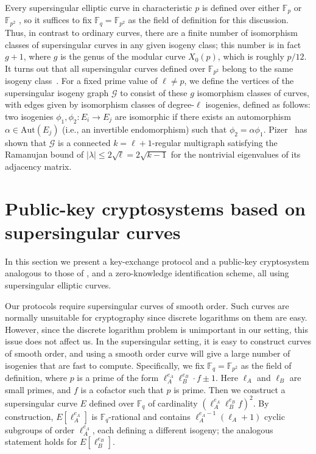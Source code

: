 \documentclass[jmc]{degruyter-journal-a}
\theoremstyle{definition}
\newcommand{\FF}{{\mathbb{F}}}
\begin{document}
Every supersingular elliptic curve in characteristic $p$ is defined
over either $\FF_p$ or $\FF_{p^2}$ \cite{Sil}, so it suffices to fix
$\FF_q = \FF_{p^2}$ as the field of definition for this
discussion. Thus, in contrast to ordinary curves, there are a finite
number of isomorphism classes of supersingular curves in any given isogeny class;
this number is in fact $g+1$, where $g$ is the genus of the modular curve $X_0(p)$,
which is roughly $p/12$. It turns out that all supersingular
curves defined over $\FF_{p^2}$ belong to the same isogeny
class~\cite{Mestre}. For a fixed prime value of $\ell \neq p$, we
define the vertices of the supersingular isogeny graph $\mathcal{G}$
to consist of these $g$ isomorphism classes of curves, with
edges given by isomorphism classes of degree-$\ell$ isogenies,
defined as follows: two isogenies $\phi_1, \phi_2 \colon E_i \to E_j$
are isomorphic if there exists an automorphism $\alpha \in
\text{Aut}(E_j)$ (i.e., an invertible endomorphism) such that $\phi_2
= \alpha\phi_1$. Pizer~\cite{pizer1,pizer2} has shown that
$\mathcal{G}$ is a connected $k = \ell + 1$-regular multigraph
satisfying the Ramanujan bound of $|\lambda| \leq 2\sqrt{\ell} =
2\sqrt{k - 1}$ for the nontrivial eigenvalues of its adjacency matrix.


\section{Public-key cryptosystems based on supersingular curves}\label{sec:kep}

In this section we present a key-exchange protocol and a public-key
cryptosystem analogous to those of \cite{R&S,Stol}, and a
zero-knowledge identification scheme, all using supersingular elliptic
curves.

Our protocols require supersingular curves of smooth order. Such
curves are normally unsuitable for cryptography since discrete
logarithms on them are easy. However, since the discrete logarithm
problem is unimportant in our setting, this issue does not affect
us. In the supersingular setting, it is easy to construct curves of
smooth order, and using a smooth order curve will give a large number
of isogenies that are fast to compute. Specifically, we fix $\FF_q =
\FF_{p^2}$ as the field of definition, where $p$ is a prime of the
form $\ell_A^{e_A} \ell_B^{e_B}\cdot f \pm 1$.  Here $\ell_A$ and
$\ell_B$ are small primes, and $f$ is a cofactor such that $p$ is
prime.  Then we construct a supersingular curve $E$ defined over
$\FF_q$ of cardinality $(\ell_A^{e_A}\ell_B^{e_B}f)^2$. By
construction, $E[\ell_A^{e_A}]$ is $\FF_q$-rational and contains
$\ell_A^{e_A-1}(\ell_A+1)$ cyclic subgroups of order $\ell_A^{e_A}$,
each defining a different isogeny; the analogous statement holds for
$E[\ell_B^{e_B}]$.
\end{document}
